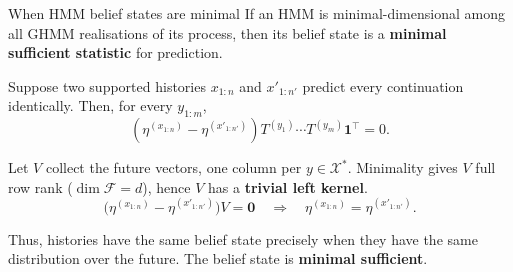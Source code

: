 \documentclass[aspectratio=169,12pt,t]{beamer}
\begin{document}
\begin{frame}{When HMM belief states are minimal}
  \setlength{\parskip}{0pt}
  \setlength{\abovedisplayskip}{5pt}
  \setlength{\abovedisplayshortskip}{5pt}
  \setlength{\belowdisplayskip}{5pt}
  \setlength{\belowdisplayshortskip}{5pt}
  If an HMM is minimal-dimensional among all GHMM realisations of its process,
  then its belief state is a \textbf{minimal sufficient statistic} for
  prediction.

  \vfill
  Suppose two supported histories $x_{1:n}$ and $x'_{1:n'}$ predict every
  continuation identically.
  Then, for every $y_{1:m}$,
  \[
    \left(
      \eta^{(x_{1:n})}-\eta^{(x'_{1:n'})}
    \right)
    T^{(y_1)}\cdots T^{(y_m)}\mathbf1^\top
    =0.
  \]

  \vfill
  Let $V$ collect the future vectors, one column per $y\in\mathcal X^*$.
  Minimality gives $V$ full row rank ($\dim\mathcal F=d$), hence $V$ has a \textbf{trivial left kernel}.
  \[
    \bigl(\eta^{(x_{1:n})}-\eta^{(x'_{1:n'})}\bigr)V=\mathbf{0}
    \quad\Longrightarrow\quad
    \eta^{(x_{1:n})}=\eta^{(x'_{1:n'})}.
  \]

  \vfill
  Thus, histories have the same belief state precisely when they have the
  same distribution over the future. The belief state is
  \textbf{minimal sufficient}.

  \vfill
  \vfill

\end{frame}
\end{document}
